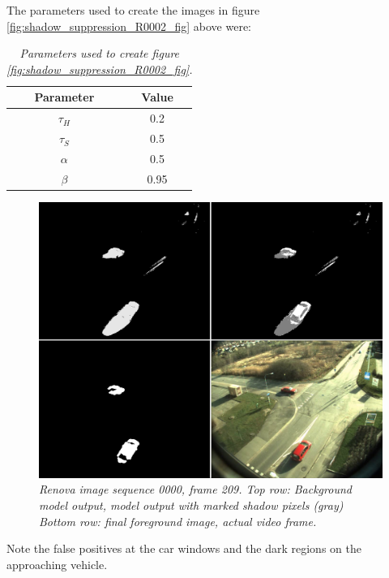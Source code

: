 The parameters used to create the images in figure \ref{fig:shadow_suppression_R0002_fig} above were:

\begin{table}[htb]
\centering
\begin{tabular}{|c|c|}
	\hline
	Parameter & Value  \\
	\hline
	$\tau_H$ &  0.2 \\
	\hline
	$\tau_S$ & 0.5 \\
	\hline
	$\alpha$ &  0.5 \\
	\hline
	$\beta$ &  0.95 \\
	\hline
\end{tabular}
\caption{\textit{Parameters used to create figure \ref{fig:shadow_suppression_R0002_fig}.}}
\label{tab:shadow_parameters_R0002_fig}
\end{table}

\newpage
\begin{figure}[htb]
	\centering
	\includegraphics[width=\linewidth]{images/ShadowRenova0000.png}
	\caption{\textit{Renova image sequence 0000, frame 209. 
	\newline
	Top row: Background model output, model output with marked shadow pixels (gray)
	\newline
	Bottom row: final foreground image, actual video frame.}}
	\label{fig:shadow_suppression_R0000_fig}  %
\end{figure}
Note the false positives at the car windows and the dark regions on the approaching vehicle.

